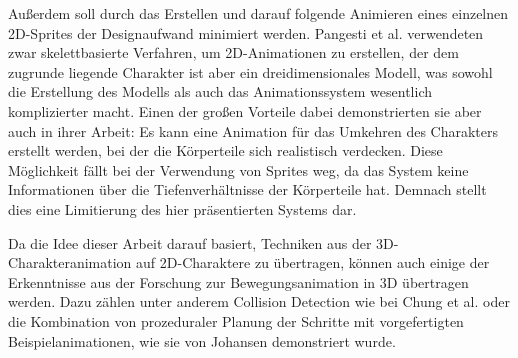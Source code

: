 Außerdem soll durch das Erstellen und darauf folgende Animieren eines einzelnen 2D-Sprites der Designaufwand minimiert werden. Pangesti et al.\cite{pangesti2019analysis} verwendeten zwar skelettbasierte Verfahren, um 2D-Animationen zu erstellen, der dem zugrunde liegende Charakter ist aber ein dreidimensionales Modell, was sowohl die Erstellung des Modells als auch das Animationssystem wesentlich komplizierter macht. Einen der großen Vorteile dabei demonstrierten sie aber auch in ihrer Arbeit: Es kann eine Animation für das Umkehren des Charakters erstellt werden, bei der die Körperteile sich realistisch verdecken. Diese Möglichkeit fällt bei der Verwendung von Sprites weg, da das System keine Informationen über die Tiefenverhältnisse der Körperteile hat. Demnach stellt dies eine Limitierung des hier präsentierten Systems dar.

Da die Idee dieser Arbeit darauf basiert, Techniken aus der 3D-Cha\-rak\-ter\-a\-ni\-ma\-tion auf 2D-Charaktere zu übertragen, können auch einige der Erkenntnisse aus der Forschung zur Bewegungsanimation in 3D übertragen werden. Dazu zählen unter anderem Collision Detection wie bei Chung et al.\cite{chung1999animation} oder die Kombination von prozeduraler Planung der Schritte mit vorgefertigten Beispielanimationen, wie sie von Johansen\cite{johansen2009automated} demonstriert wurde.